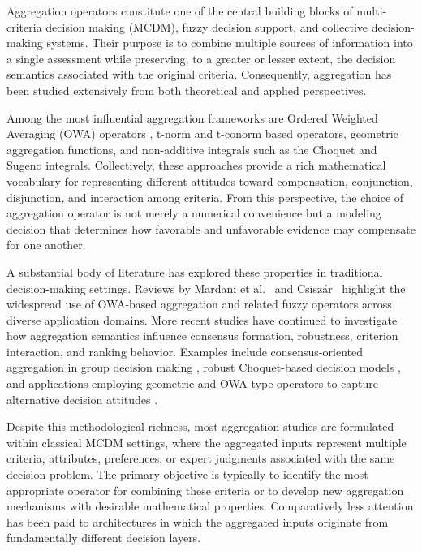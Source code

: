 \documentclass[mathematics,article,submit,moreauthors]{Definitions/mdpi}
\begin{document}
Aggregation operators constitute one of the central building blocks of
multi-criteria decision making (MCDM), fuzzy decision support, and
collective decision-making systems. Their purpose is to combine multiple
sources of information into a single assessment while preserving, to a
greater or lesser extent, the decision semantics associated with the
original criteria. Consequently, aggregation has been studied
extensively from both theoretical and applied perspectives.

Among the most influential aggregation frameworks are Ordered Weighted
Averaging (OWA) operators \citep{Yager1988,Yager2005}, t-norm and
t-conorm based operators, geometric aggregation functions, and
non-additive integrals such as the Choquet and Sugeno integrals.
Collectively, these approaches provide a rich mathematical vocabulary
for representing different attitudes toward compensation, conjunction,
disjunction, and interaction among criteria. From this perspective, the
choice of aggregation operator is not merely a numerical convenience but
a modeling decision that determines how favorable and unfavorable
evidence may compensate for one another.

A substantial body of literature has explored these properties in
traditional decision-making settings. Reviews by
Mardani et al.~\citep{Mardani2018} and
Csisz\'ar~\citep{Csiszar2021} highlight the widespread use of OWA-based
aggregation and related fuzzy operators across diverse application
domains. More recent studies have continued to investigate how
aggregation semantics influence consensus formation, robustness,
criterion interaction, and ranking behavior. Examples include
consensus-oriented aggregation in group decision making
\citep{MoralEtAl2017,TrilloEtAl2023}, robust Choquet-based decision
models \citep{Yang2022Tolerance,Liao2023Contextual}, and applications
employing geometric and OWA-type operators to capture alternative
decision attitudes \citep{Stroppiana2022Explainable,Alcantud2023Multi}.

Despite this methodological richness, most aggregation studies are
formulated within classical MCDM settings, where the aggregated inputs
represent multiple criteria, attributes, preferences, or expert
judgments associated with the same decision problem. The primary
objective is typically to identify the most appropriate operator for
combining these criteria or to develop new aggregation mechanisms with
desirable mathematical properties. Comparatively less attention has been
paid to architectures in which the aggregated inputs originate from
fundamentally different decision layers.
\end{document}
